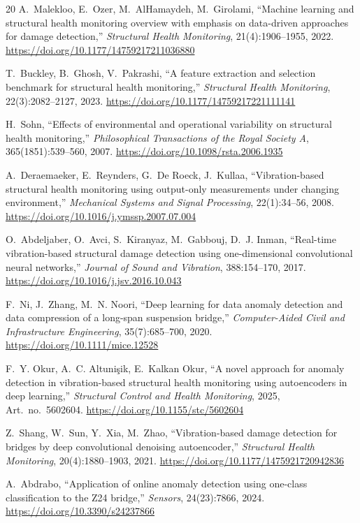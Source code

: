 \documentclass[11pt,a4paper]{article}
\begin{document}
\begin{thebibliography}{20}
A.~Malekloo, E.~Ozer, M.~AlHamaydeh, M.~Girolami,
``Machine learning and structural health monitoring overview with emphasis on
data-driven approaches for damage detection,''
\emph{Structural Health Monitoring}, 21(4):1906--1955, 2022.
\url{https://doi.org/10.1177/14759217211036880}

T.~Buckley, B.~Ghosh, V.~Pakrashi,
``A feature extraction and selection benchmark for structural health
monitoring,''
\emph{Structural Health Monitoring}, 22(3):2082--2127, 2023.
\url{https://doi.org/10.1177/14759217221111141}

H.~Sohn,
``Effects of environmental and operational variability on structural health
monitoring,''
\emph{Philosophical Transactions of the Royal Society A},
365(1851):539--560, 2007.
\url{https://doi.org/10.1098/rsta.2006.1935}

A.~Deraemaeker, E.~Reynders, G.~De Roeck, J.~Kullaa,
``Vibration-based structural health monitoring using output-only measurements
under changing environment,''
\emph{Mechanical Systems and Signal Processing}, 22(1):34--56, 2008.
\url{https://doi.org/10.1016/j.ymssp.2007.07.004}

O.~Abdeljaber, O.~Avci, S.~Kiranyaz, M.~Gabbouj, D.~J. Inman,
``Real-time vibration-based structural damage detection using one-dimensional
convolutional neural networks,''
\emph{Journal of Sound and Vibration}, 388:154--170, 2017.
\url{https://doi.org/10.1016/j.jsv.2016.10.043}

F.~Ni, J.~Zhang, M.~N. Noori,
``Deep learning for data anomaly detection and data compression of a
long-span suspension bridge,''
\emph{Computer-Aided Civil and Infrastructure Engineering},
35(7):685--700, 2020.
\url{https://doi.org/10.1111/mice.12528}

F.~Y. Okur, A.~C. Altuni\c{s}ik, E.~Kalkan Okur,
``A novel approach for anomaly detection in vibration-based structural health
monitoring using autoencoders in deep learning,''
\emph{Structural Control and Health Monitoring}, 2025, Art.\ no.\ 5602604.
\url{https://doi.org/10.1155/stc/5602604}

Z.~Shang, W.~Sun, Y.~Xia, M.~Zhao,
``Vibration-based damage detection for bridges by deep convolutional denoising
autoencoder,''
\emph{Structural Health Monitoring}, 20(4):1880--1903, 2021.
\url{https://doi.org/10.1177/1475921720942836}

A.~Abdrabo,
``Application of online anomaly detection using one-class classification to
the Z24 bridge,''
\emph{Sensors}, 24(23):7866, 2024.
\url{https://doi.org/10.3390/s24237866}


\end{thebibliography}
\end{document}
